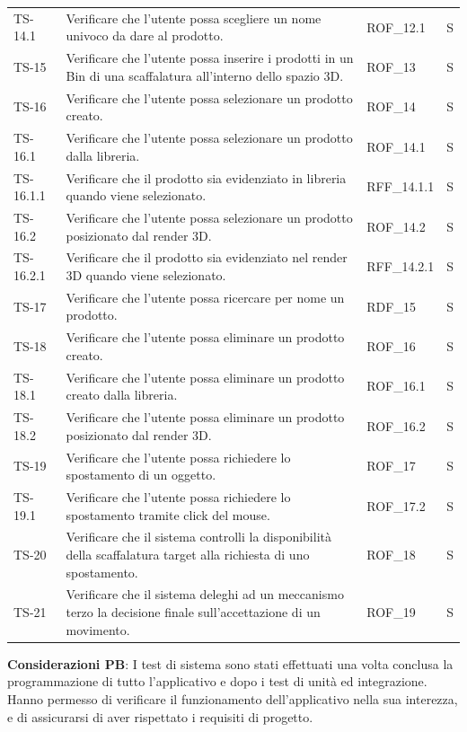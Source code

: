 \begin{xltabular}{0.9\textwidth}{X | p{0.5\textwidth} | X | p{0.9cm}}
    TS-14.1& Verificare che l'utente possa scegliere un nome univoco da dare al prodotto. & ROF\_12.1& S \\
    TS-15 & Verificare che l'utente possa inserire i prodotti in un Bin di una scaffalatura all'interno dello spazio 3D. & ROF\_13& S\\
    TS-16 & Verificare che l'utente possa selezionare un prodotto creato. & ROF\_14 & S\\
    TS-16.1 & Verificare che l'utente possa selezionare un prodotto dalla libreria. & ROF\_14.1& S\\
    TS-16.1.1 & Verificare che il prodotto sia evidenziato in libreria quando viene selezionato. & RFF\_14.1.1& S \\
    TS-16.2 & Verificare che l'utente possa selezionare un prodotto posizionato dal render 3D. & ROF\_14.2& S\\
    TS-16.2.1 & Verificare che il prodotto sia evidenziato nel render 3D quando viene selezionato. & RFF\_14.2.1& S\\
    TS-17 & Verificare che l'utente possa ricercare per nome un prodotto. & RDF\_15& S\\
    TS-18& Verificare che l'utente possa eliminare un prodotto creato. & ROF\_16& S\\
    TS-18.1 & Verificare che l'utente possa eliminare un prodotto creato dalla libreria. & ROF\_16.1& S \\
    TS-18.2 & Verificare che l'utente possa eliminare un prodotto posizionato dal render 3D. & ROF\_16.2& S \\
    TS-19& Verificare che l'utente possa richiedere lo spostamento di un oggetto. & ROF\_17& S\\
    TS-19.1 & Verificare che l'utente possa richiedere lo spostamento tramite click del mouse. & ROF\_17.2& S\\
    TS-20 & Verificare che il sistema controlli la disponibilità della scaffalatura target alla richiesta di uno spostamento. & ROF\_18& S\\
    TS-21  & Verificare che il sistema deleghi ad un meccanismo terzo la decisione finale sull'accettazione di un movimento. & ROF\_19& S\\
    \hline
\end{xltabular}

\vspace{0.2cm} \noindent\textbf{Considerazioni PB}: I test di sistema sono stati effettuati una volta conclusa la programmazione di tutto l'applicativo e dopo i test di unità ed integrazione. Hanno permesso di verificare il funzionamento dell'applicativo nella sua interezza, e di assicurarsi di aver rispettato i requisiti di progetto.

